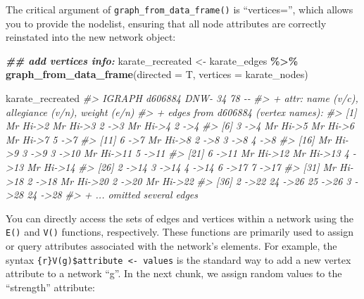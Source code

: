 \documentclass[
]{book}
\newenvironment{Shaded}{\begin{snugshade}}{\end{snugshade}}
\newcommand{\AttributeTok}[1]{\textcolor[rgb]{0.13,0.29,0.53}{#1}}
\newcommand{\CommentTok}[1]{\textcolor[rgb]{0.56,0.35,0.01}{\textit{#1}}}
\newcommand{\DocumentationTok}[1]{\textcolor[rgb]{0.56,0.35,0.01}{\textbf{\textit{#1}}}}
\newcommand{\FunctionTok}[1]{\textcolor[rgb]{0.13,0.29,0.53}{\textbf{#1}}}
\newcommand{\NormalTok}[1]{#1}
\newcommand{\OtherTok}[1]{\textcolor[rgb]{0.56,0.35,0.01}{#1}}
\newcommand{\SpecialCharTok}[1]{\textcolor[rgb]{0.81,0.36,0.00}{\textbf{#1}}}
\begin{document}
The critical argument of \texttt{graph\_from\_data\_frame()} is ``vertices='', which allows you to provide the nodelist, ensuring that all node attributes are correctly reinstated into the new network object:

\begin{Shaded}
\begin{Highlighting}[]
\DocumentationTok{\#\# add vertices info:}
\NormalTok{karate\_recreated }\OtherTok{\textless{}{-}}\NormalTok{ karate\_edges }\SpecialCharTok{\%\textgreater{}\%} 
  \FunctionTok{graph\_from\_data\_frame}\NormalTok{(}\AttributeTok{directed =}\NormalTok{ T,}
                        \AttributeTok{vertices =}\NormalTok{ karate\_nodes)}

\NormalTok{karate\_recreated}
\CommentTok{\#\textgreater{} IGRAPH d606884 DNW{-} 34 78 {-}{-} }
\CommentTok{\#\textgreater{} + attr: name (v/c), allegiance (v/n), weight (e/n)}
\CommentTok{\#\textgreater{} + edges from d606884 (vertex names):}
\CommentTok{\#\textgreater{}  [1] Mr Hi{-}\textgreater{}2  Mr Hi{-}\textgreater{}3  2    {-}\textgreater{}3  Mr Hi{-}\textgreater{}4  2    {-}\textgreater{}4 }
\CommentTok{\#\textgreater{}  [6] 3    {-}\textgreater{}4  Mr Hi{-}\textgreater{}5  Mr Hi{-}\textgreater{}6  Mr Hi{-}\textgreater{}7  5    {-}\textgreater{}7 }
\CommentTok{\#\textgreater{} [11] 6    {-}\textgreater{}7  Mr Hi{-}\textgreater{}8  2    {-}\textgreater{}8  3    {-}\textgreater{}8  4    {-}\textgreater{}8 }
\CommentTok{\#\textgreater{} [16] Mr Hi{-}\textgreater{}9  3    {-}\textgreater{}9  3    {-}\textgreater{}10 Mr Hi{-}\textgreater{}11 5    {-}\textgreater{}11}
\CommentTok{\#\textgreater{} [21] 6    {-}\textgreater{}11 Mr Hi{-}\textgreater{}12 Mr Hi{-}\textgreater{}13 4    {-}\textgreater{}13 Mr Hi{-}\textgreater{}14}
\CommentTok{\#\textgreater{} [26] 2    {-}\textgreater{}14 3    {-}\textgreater{}14 4    {-}\textgreater{}14 6    {-}\textgreater{}17 7    {-}\textgreater{}17}
\CommentTok{\#\textgreater{} [31] Mr Hi{-}\textgreater{}18 2    {-}\textgreater{}18 Mr Hi{-}\textgreater{}20 2    {-}\textgreater{}20 Mr Hi{-}\textgreater{}22}
\CommentTok{\#\textgreater{} [36] 2    {-}\textgreater{}22 24   {-}\textgreater{}26 25   {-}\textgreater{}26 3    {-}\textgreater{}28 24   {-}\textgreater{}28}
\CommentTok{\#\textgreater{} + ... omitted several edges}
\end{Highlighting}
\end{Shaded}

You can directly access the sets of edges and vertices within a network using the \texttt{E()} and \texttt{V()} functions, respectively. These functions are primarily used to assign or query attributes associated with the network's elements. For example, the syntax \texttt{\{r\}V(g)\$attribute\ \textless{}-\ values} is the standard way to add a new vertex attribute to a network ``g''. In the next chunk, we assign random values to the ``strength'' attribute:
\end{document}
